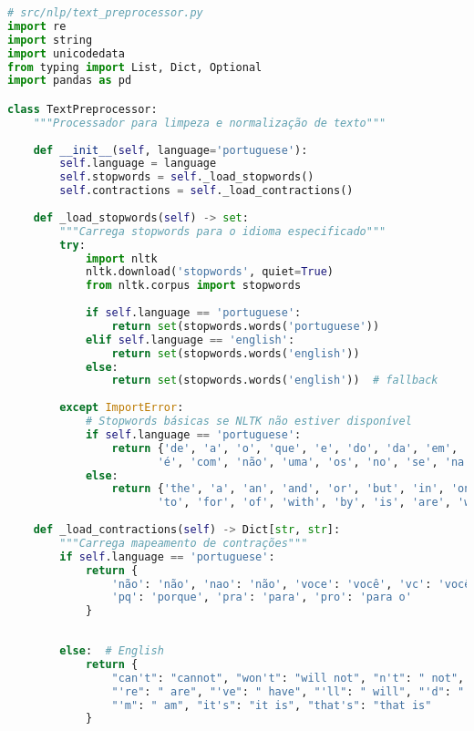 \begin{pythonbox}
\begin{lstlisting}[language=Python]
# src/nlp/text_preprocessor.py
import re
import string
import unicodedata
from typing import List, Dict, Optional
import pandas as pd

class TextPreprocessor:
    """Processador para limpeza e normalização de texto"""
    
    def __init__(self, language='portuguese'):
        self.language = language
        self.stopwords = self._load_stopwords()
        self.contractions = self._load_contractions()
        
    def _load_stopwords(self) -> set:
        """Carrega stopwords para o idioma especificado"""
        try:
            import nltk
            nltk.download('stopwords', quiet=True)
            from nltk.corpus import stopwords
            
            if self.language == 'portuguese':
                return set(stopwords.words('portuguese'))
            elif self.language == 'english':
                return set(stopwords.words('english'))
            else:
                return set(stopwords.words('english'))  # fallback
                
        except ImportError:
            # Stopwords básicas se NLTK não estiver disponível
            if self.language == 'portuguese':
                return {'de', 'a', 'o', 'que', 'e', 'do', 'da', 'em', 'um', 'para', 
                       'é', 'com', 'não', 'uma', 'os', 'no', 'se', 'na', 'por', 'mais'}
            else:
                return {'the', 'a', 'an', 'and', 'or', 'but', 'in', 'on', 'at', 
                       'to', 'for', 'of', 'with', 'by', 'is', 'are', 'was', 'were'}
    
    def _load_contractions(self) -> Dict[str, str]:
        """Carrega mapeamento de contrações"""
        if self.language == 'portuguese':
            return {
                'não': 'não', 'nao': 'não', 'voce': 'você', 'vc': 'você',
                'pq': 'porque', 'pra': 'para', 'pro': 'para o'
            }
\end{lstlisting}
\end{pythonbox}
\begin{pythonbox}
\begin{lstlisting}[language=Python]            
            
        else:  # English
            return {
                "can't": "cannot", "won't": "will not", "n't": " not",
                "'re": " are", "'ve": " have", "'ll": " will", "'d": " would",
                "'m": " am", "it's": "it is", "that's": "that is"
            }
\end{lstlisting}
\end{pythonbox}

